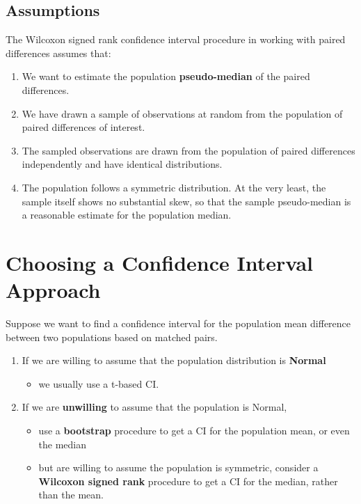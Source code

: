 \documentclass[
]{book}
\providecommand{\tightlist}{%
  \setlength{\itemsep}{0pt}\setlength{\parskip}{0pt}}
\begin{document}
\hypertarget{assumptions-2}{%
\subsection{Assumptions}\label{assumptions-2}}

The Wilcoxon signed rank confidence interval procedure in working with paired differences assumes that:

\begin{enumerate}
\def\labelenumi{\arabic{enumi}.}
\tightlist
\item
  We want to estimate the population \textbf{pseudo-median} of the paired differences.
\item
  We have drawn a sample of observations at random from the population of paired differences of interest.
\item
  The sampled observations are drawn from the population of paired differences independently and have identical distributions.
\item
  The population follows a symmetric distribution. At the very least, the sample itself shows no substantial skew, so that the sample pseudo-median is a reasonable estimate for the population median.
\end{enumerate}

\hypertarget{choosing-a-confidence-interval-approach}{%
\section{Choosing a Confidence Interval Approach}\label{choosing-a-confidence-interval-approach}}

Suppose we want to find a confidence interval for the population mean difference between two populations based on matched pairs.

\begin{enumerate}
\def\labelenumi{\arabic{enumi}.}
\tightlist
\item
  If we are willing to assume that the population distribution is \textbf{Normal}

  \begin{itemize}
  \tightlist
  \item
    we usually use a t-based CI.
  \end{itemize}
\item
  If we are \textbf{unwilling} to assume that the population is Normal,

  \begin{itemize}
  \tightlist
  \item
    use a \textbf{bootstrap} procedure to get a CI for the population mean, or even the median
  \item
    but are willing to assume the population is symmetric, consider a \textbf{Wilcoxon signed rank} procedure to get a CI for the median, rather than the mean.
  \end{itemize}
\end{enumerate}
\end{document}
